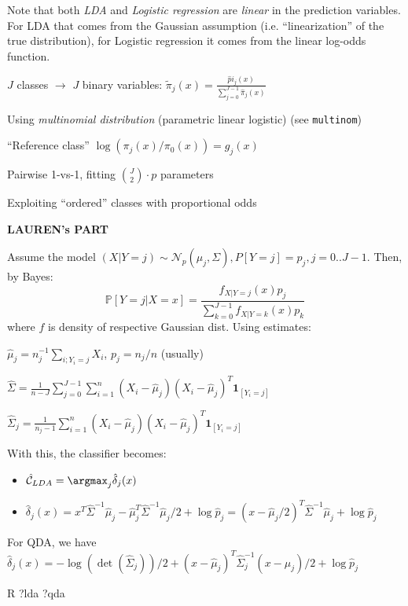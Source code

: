 \begin{notebox}\nospacing{}
  Note that both \emph{LDA} and \emph{Logistic regression} are \emph{linear} in the prediction variables.
  For LDA that comes from the Gaussian assumption (i.e. ``linearization'' of the true distribution), for Logistic regression it comes from the linear log-odds function.
\end{notebox}
\begin{notebox}\nospacing{}
  \begin{enumeratenosep}
  \item $J$ classes $\rightarrow$ $J$ binary variables: $\tilde \pi_j(x) = \frac{\hat pi_j(x)}{\sum_{j=0}^{J-1}\hat\pi_j(x)}$
  \item Using \emph{multinomial distribution} (parametric linear logistic) (see \verb!multinom!)
  \item ``Reference class'' $\log(\pi_j(x)/\pi_0(x)) = g_j(x)$
  \item Pairwise 1-vs-1, fitting ${J \choose 2}\cdot p$ parameters
  \item Exploiting ``ordered'' classes with proportional odds
  \end{enumeratenosep}
\end{notebox}

\textbf{LAUREN's PART}
\begin{sectionbox}
Assume the model $(X|Y=j) \sim \mathcal{N}_p(\mu_j, \Sigma), P[Y=j] = p_j, j=0..J-1$. Then, by Bayes:
\[
\mathbb{P}[Y=j|X=x] = \frac{f_{X|Y=j}(x)p_j}{\sum_{k=0}^{J-1} f_{X|Y=k}(x)p_k}
\]
where $f$ is density of respective Gaussian dist. Using estimates:
\begin{enumeratenosep}[label=\roman*]
\item $\hat{\mu}_j = n_j^{-1}\sum_{i;Y_i=j}X_i$, $p_j = n_j/n$ (usually)
\item $\hat{\Sigma} = \frac{1}{n-J}\sum_{j=0}^{J-1}\sum_{i=1}^{n}(X_i-\hat{\mu}_j)(X_i-\hat{\mu}_j)^T \mathbf{1}_{[Y_i=j]}$
\item$\hat{\Sigma}_j = \frac{1}{n_j-1}\sum_{i=1}^{n}(X_i-\hat{\mu}_j)(X_i-\hat{\mu}_j)^T \mathbf{1}_{[Y_i=j]}$
\end{enumeratenosep}
With this, the classifier becomes:
\begin{itemize}
	\item	$\hat{\mathcal{C}}_{LDA} = \argmax_{j} \hat{\delta}_j(x)$
	\item $\hat{\delta}_j(x) = x^T\hat{\Sigma}^{-1}\hat{\mu}_j -\hat{\mu}_j^T\hat{\Sigma}^{-1}\hat{\mu}_j/2 + \log{\hat{p}_j} 
	 =  (x-\hat{\mu}_j/2)^T\hat{\Sigma}^{-1}\hat{\mu}_j + \log{\hat{p}_j}$
\end{itemize}
For QDA, we have $\hat{\delta}_j(x) =  - \log{(\det{(\hat{\Sigma}_j)})}/2 +  (x-\hat{\mu}_j)^T\hat{\Sigma}_j^{-1} (x-\hat{\mu}_j)/2 + \log{\hat{p}_j} $
\begin{mintlinebox}{R}
?lda ?qda
\end{mintlinebox}	
\end{sectionbox}

